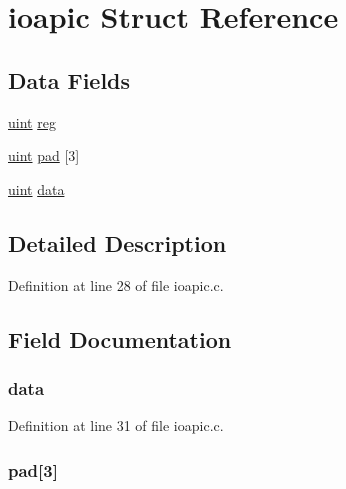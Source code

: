 \hypertarget{structioapic}{\section{ioapic Struct Reference}
\label{structioapic}
}
\subsection*{Data Fields}
\begin{DoxyCompactItemize}
\item 
\hyperlink{types_8h_a91ad9478d81a7aaf2593e8d9c3d06a14}{uint} \hyperlink{structioapic_a1705e7cf67054ce9923334e3d530fcd4}{reg}
\item 
\hyperlink{types_8h_a91ad9478d81a7aaf2593e8d9c3d06a14}{uint} \hyperlink{structioapic_a099958e6ec873597215f4ef77c5cb2c3}{pad} \mbox{[}3\mbox{]}
\item 
\hyperlink{types_8h_a91ad9478d81a7aaf2593e8d9c3d06a14}{uint} \hyperlink{structioapic_a4257a9563e3f5c94350c002195cecc47}{data}
\end{DoxyCompactItemize}


\subsection{Detailed Description}


Definition at line 28 of file ioapic.\-c.



\subsection{Field Documentation}
\hypertarget{structioapic_a4257a9563e3f5c94350c002195cecc47}{
\subsubsection[{data}]{ data}}\label{structioapic_a4257a9563e3f5c94350c002195cecc47}


Definition at line 31 of file ioapic.\-c.

\hypertarget{structioapic_a099958e6ec873597215f4ef77c5cb2c3}{
\subsubsection[{pad}]{ pad\mbox{[}3\mbox{]}}}\label{structioapic_a099958e6ec873597215f4ef77c5cb2c3}


